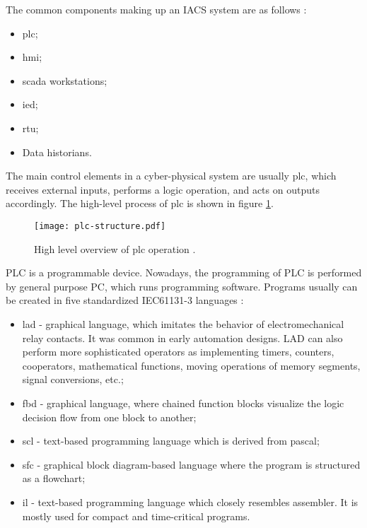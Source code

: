 The common components making up an IACS system are as follows \parencite{30-rewiev-of-all-testbeds2020}: 

\begin{itemize}
	\item \gls*{plc};
	\item \gls*{hmi};
	\item \gls*{scada} workstations;
	\item \gls*{ied};
	\item \gls*{rtu};
	\item Data historians.
\end{itemize}

The main control elements in a cyber-physical system are usually \gls*{plc}, which receives external inputs, performs a logic operation, and acts on outputs accordingly. The high-level process of \gls*{plc} is shown in figure \ref{fig:plc-operation}.

\begin{figure}
	\texttt{[image: plc-structure.pdf]}
	\caption{High level overview of \gls*{plc} operation  \parencite{97-siemens-plc-intro}.}
	\label{fig:plc-operation}
\end{figure} 

PLC is a programmable device. Nowadays, the programming of PLC is performed by general purpose PC, which runs programming software. Programs usually can be created in five standardized IEC61131-3 languages \parencite{WEB-14-plc-languages}: 

\begin{itemize}
	\item \gls*{lad} - graphical language, which imitates the behavior of electromechanical relay contacts. It was common in early automation designs. LAD can also perform more sophisticated operators as implementing timers, counters, cooperators, mathematical functions, moving operations of memory segments, signal conversions, etc.;
	
	\item \gls*{fbd} - graphical language, where chained function blocks visualize the logic decision flow from one block to another;
	
	\item \gls*{scl} - text-based programming language which is derived from pascal;
	
	\item \gls*{sfc} - graphical block diagram-based language where the program is structured as a flowchart;
	
	\item \gls*{il} - text-based programming language which closely resembles assembler. It is mostly used for compact and time-critical programs.
\end{itemize}


